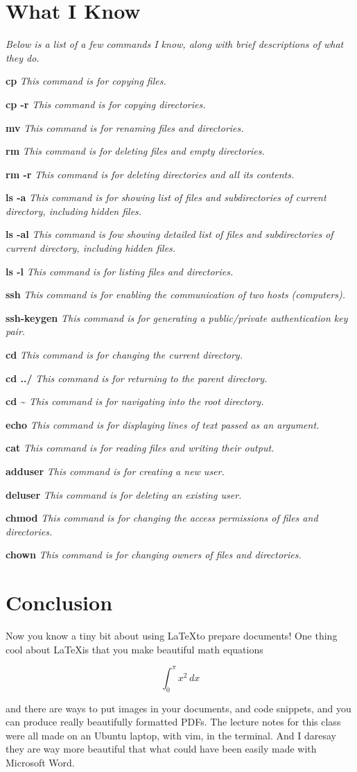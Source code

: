 \documentclass[11pt]{article}
\newcommand{\iknow}[2]{\par\textbf{#1} \textit{#2}}
\begin{document}
\section*{What I Know}

\noindent\textit{Below is a list of a few commands I know, along with brief descriptions of what they do.}
\iknow{cp}{This command is for copying files.}
\iknow{cp -r}{This command is for copying directories.}
\iknow{mv}{This command is for renaming files and directories.}
\iknow{rm}{This command is for deleting files and empty directories.}
\iknow{rm -r}{This command is for deleting directories and all its contents.}
\iknow{ls -a}{This command is for showing list of files and subdirectories of current directory, including hidden files.}
\iknow{ls -al}{This command is fow showing detailed list of files and subdirectories of current directory, including hidden files.}
\iknow{ls -l}{This command is for listing files and directories.}
\iknow{ssh}{This command is for enabling the communication of two hosts (computers).}
\iknow{ssh-keygen}{This command is for generating a public/private authentication key pair.}
\iknow{cd}{This command is for changing the current directory.}
\iknow{cd ../}{This command is for returning to the parent directory.}
\iknow{cd \textasciitilde}{This command is for navigating into the root directory.}
\iknow{echo}{This command is for displaying lines of text passed as an argument.}
\iknow{cat}{This command is for reading files and writing their output.}
\iknow{adduser}{This command is for creating a new user.}
\iknow{deluser}{This command is for deleting an existing user.}
\iknow{chmod}{This command is for changing the access permissions of files and directories.}
\iknow{chown}{This command is for changing owners of files and directories.}

\section*{Conclusion}
Now you know a tiny bit about using \LaTeX to prepare documents! One thing cool about \LaTeX is that you make beautiful math equations

\begin{equation}
\int_{0}^{\pi}x^2\,dx
\end{equation}

and there are ways to put images in your documents, and code snippets, and you can produce really beautifully formatted PDFs. The lecture notes for this class were all made on an Ubuntu laptop, with vim, in the terminal. And I daresay they are way more beautiful that what could have been easily made with Microsoft Word.
\end{document}
